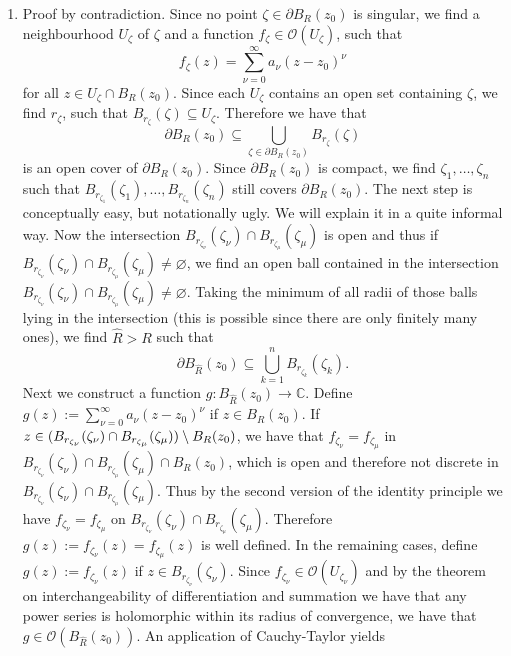 \begin{enumerate}[label = \textbf{Exercise \arabic*.},wide = 0pt, itemsep=1.5ex]
	\item Proof by contradiction. Since no point $\zeta \in \partial B_R(z_0)$ is singular, we find a neighbourhood $U_\zeta$ of $\zeta$ and a function $f_\zeta \in \mathcal{O}(U_\zeta)$, such that 
		\begin{equation}
			f_\zeta(z) = \sum_{\nu = 0}^\infty a_\nu(z - z_0)^\nu
		\end{equation}
		\noindent for all $z \in U_\zeta \cap B_R(z_0)$. Since each $U_\zeta$ contains an open set containing $\zeta$, we find $r_\zeta$, such that $B_{r_\zeta}(\zeta) \subseteq U_\zeta$. Therefore we have that
		\begin{equation}
			\partial B_R(z_0) \subseteq \bigcup_{\zeta \in \partial B_R(z_0)} B_{r_\zeta}(\zeta)
		\end{equation}
		\noindent is an open cover of $\partial B_R(z_0)$. Since $\partial B_R(z_0)$ is compact, we find $\zeta_1,\dots,\zeta_n$ such that $B_{r_{\zeta_1}}(\zeta_1),\dots,B_{r_{\zeta_n}}(\zeta_n)$ still covers $\partial B_R(z_0)$. The next step is conceptually easy, but notationally ugly. We will explain it in a quite informal way. Now the intersection $B_{r_{\zeta_\nu}}(\zeta_\nu) \cap B_{r_{\zeta_\mu}}(\zeta_\mu)$ is open and thus if $B_{r_{\zeta_\nu}}(\zeta_\nu) \cap B_{r_{\zeta_\mu}}(\zeta_\mu) \neq \varnothing$, we find an open ball contained in the intersection $B_{r_{\zeta_\nu}}(\zeta_\nu) \cap B_{r_{\zeta_\mu}}(\zeta_\mu) \neq \varnothing$. Taking the minimum of all radii of those balls lying in the intersection (this is possible since there are only finitely many ones), we find $\hat{R} > R$ such that
		\begin{equation}
			\partial B_{\hat{R}}(z_0) \subseteq \bigcup_{k = 1}^n B_{r_{\zeta_k}}(\zeta_k).
		\end{equation}
		Next we construct a function $g: B_{\hat{R}}(z_0) \to \mathbb{C}$. Define $g(z) := \sum_{\nu = 0}^\infty a_\nu (z - z_0)^\nu$ if $z \in B_R(z_0)$. If $z \in \del[0]{B_{r_{\zeta_\nu}}(\zeta_\nu) \cap B_{r_{\zeta_\mu}}(\zeta_\mu)} \setminus B_R(z_0)$, we have that $f_{\zeta_\nu} = f_{\zeta_\mu}$ in $B_{r_{\zeta_\nu}}(\zeta_\nu) \cap B_{r_{\zeta_\mu}}(\zeta_\mu) \cap B_R(z_0)$, which is open and therefore not discrete in $B_{r_{\zeta_\nu}}(\zeta_\nu) \cap B_{r_{\zeta_\mu}}(\zeta_\mu)$. Thus by the second version of the identity principle we have $f_{\zeta_\nu} = f_{\zeta_{\mu}}$ on $B_{r_{\zeta_\nu}}(\zeta_\nu) \cap B_{r_{\zeta_\mu}}(\zeta_\mu)$. Therefore $g(z) := f_{\zeta_{\nu}}(z) = f_{\zeta_\mu}(z)$ is well defined. In the remaining cases, define $g(z) := f_{\zeta_\nu}(z)$ if $z \in B_{r_{\zeta_\nu}}(\zeta_\nu)$. Since $f_{\zeta_\nu} \in \mathcal{O}(U_{\zeta_\nu})$ and by the theorem on interchangeability of differentiation and summation we have that any power series is holomorphic within its radius of convergence, we have that $g \in \mathcal{O}(B_{\hat{R}}(z_0))$. An application of Cauchy-Taylor yields

\end{enumerate}
